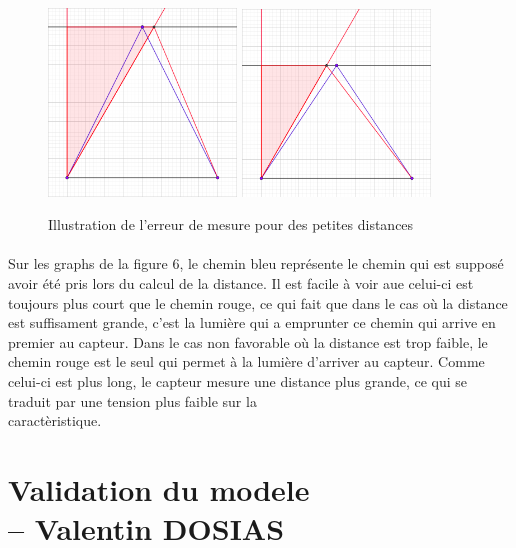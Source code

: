 \documentclass[oneside,a4paper,12pt]{article}
\begin{document}
	
	\begin{figure}[h]
		\includegraphics[width=5cm]{goodCase.png}
		\hspace*{\fill}
		\includegraphics[width=5cm]{badCase.png}
		\caption{Illustration de l'erreur de mesure pour des petites distances}
	\end{figure}
	
	\paragraph{}
	Sur les graphs de la figure 6, le chemin bleu représente le chemin qui est supposé avoir été pris lors du calcul de la distance. Il est facile à voir aue celui-ci est toujours plus court que le chemin rouge, ce qui fait que dans le cas o\`{u} la distance est suffisament grande, c'est la lumière qui a emprunter ce chemin qui arrive en premier au capteur. Dans le cas non favorable o\`{u} la distance est trop faible, le chemin rouge est le seul qui permet à la lumière d'arriver au capteur. Comme celui-ci est plus long, le capteur mesure une distance plus grande, ce qui se traduit par une tension plus faible sur la \\caractèristique.\\
	
	\newpage
	
	
	\newpage
	\section{Validation du modele\\ -- Valentin DOSIAS}
\end{document}

